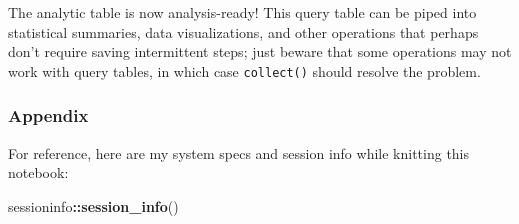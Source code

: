 \documentclass[]{article}
\newenvironment{Shaded}{\begin{snugshade}}{\end{snugshade}}
\newcommand{\KeywordTok}[1]{\textcolor[rgb]{0.13,0.29,0.53}{\textbf{#1}}}
\newcommand{\OperatorTok}[1]{\textcolor[rgb]{0.81,0.36,0.00}{\textbf{#1}}}
\newcommand{\NormalTok}[1]{#1}
\begin{document}
The analytic table is now analysis-ready! This query table can be piped
into statistical summaries, data visualizations, and other operations
that perhaps don't require saving intermittent steps; just beware that
some operations may not work with query tables, in which case
\texttt{collect()} should resolve the problem.

\subsubsection{Appendix}\label{appendix}

For reference, here are my system specs and session info while knitting
this notebook:

\begin{Shaded}
\begin{Highlighting}[]
\NormalTok{sessioninfo}\OperatorTok{::}\KeywordTok{session_info}\NormalTok{()}
\end{Highlighting}
\end{Shaded}
\end{document}

